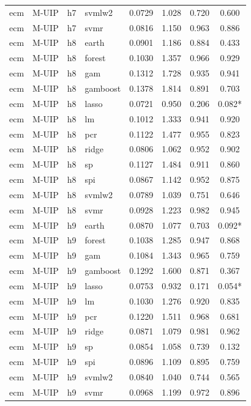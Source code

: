 \begin{ThreePartTable}
\begin{longtable}[t]{llclcccc}
ecm & M-UIP & h7 & svmlw2 & 0.0729 & 1.028 & 0.720 & 0.600\\
ecm & M-UIP & h7 & svmr & 0.0816 & 1.150 & 0.963 & 0.886\\
\addlinespace
ecm & M-UIP & h8 & earth & 0.0901 & 1.186 & 0.884 & 0.433\\
ecm & M-UIP & h8 & forest & 0.1030 & 1.357 & 0.966 & 0.929\\
ecm & M-UIP & h8 & gam & 0.1312 & 1.728 & 0.935 & 0.941\\
ecm & M-UIP & h8 & gamboost & 0.1378 & 1.814 & 0.891 & 0.703\\
ecm & M-UIP & h8 & lasso & 0.0721 & 0.950 & 0.206 & 0.082*\\
ecm & M-UIP & h8 & lm & 0.1012 & 1.333 & 0.941 & 0.920\\
ecm & M-UIP & h8 & pcr & 0.1122 & 1.477 & 0.955 & 0.823\\
ecm & M-UIP & h8 & ridge & 0.0806 & 1.062 & 0.952 & 0.902\\
ecm & M-UIP & h8 & sp & 0.1127 & 1.484 & 0.911 & 0.860\\
ecm & M-UIP & h8 & spi & 0.0867 & 1.142 & 0.952 & 0.875\\
ecm & M-UIP & h8 & svmlw2 & 0.0789 & 1.039 & 0.751 & 0.646\\
ecm & M-UIP & h8 & svmr & 0.0928 & 1.223 & 0.982 & 0.945\\
\addlinespace
ecm & M-UIP & h9 & earth & 0.0870 & 1.077 & 0.703 & 0.092*\\
ecm & M-UIP & h9 & forest & 0.1038 & 1.285 & 0.947 & 0.868\\
ecm & M-UIP & h9 & gam & 0.1084 & 1.343 & 0.965 & 0.759\\
ecm & M-UIP & h9 & gamboost & 0.1292 & 1.600 & 0.871 & 0.367\\
ecm & M-UIP & h9 & lasso & 0.0753 & 0.932 & 0.171 & 0.054*\\
ecm & M-UIP & h9 & lm & 0.1030 & 1.276 & 0.920 & 0.835\\
ecm & M-UIP & h9 & pcr & 0.1220 & 1.511 & 0.968 & 0.681\\
ecm & M-UIP & h9 & ridge & 0.0871 & 1.079 & 0.981 & 0.962\\
ecm & M-UIP & h9 & sp & 0.0854 & 1.058 & 0.739 & 0.132\\
ecm & M-UIP & h9 & spi & 0.0896 & 1.109 & 0.895 & 0.759\\
ecm & M-UIP & h9 & svmlw2 & 0.0840 & 1.040 & 0.744 & 0.565\\
ecm & M-UIP & h9 & svmr & 0.0968 & 1.199 & 0.972 & 0.896\\

\end{longtable}
\end{ThreePartTable}
